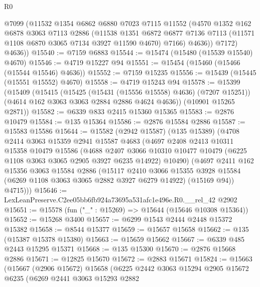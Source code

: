 \begin{lexlean}{R0}
\begin{coremodule}
          @7099
          (@11532
            @1354
            @6862
            @6880
            @7023
            @7115
            @11552
            (@4570
              @1352
              @162
              @6878
              @3063
              @7113
              @2886
              (@11538
                @1351
                @6872
                @6877
                @7136
                @7113
                (@11571 @1108 @6870 @3065 @7134 @3927 @11590 @4670)
                @7166)
              @4636))
          @7172)
        @4636))
@15540 := @7159 @6883
@15544 := @15474 (@15480 (@15539 @15540) @4670)
@15546 := @4719 @15227 @94
@15551 := @15454 (@15460 (@15466 (@15544 @15546) @4636))
@15552 := @7159 @15235
@15556 := @15439 (@15445 (@15551 @15552) @4670)
@15558 := @4719 @15243 @94
@15578 := @15399
    (@15409
      (@15415
        (@15425 (@15431 (@15556 @15558) @4636) (@7207 @15251))
        (@4614 @162 @3063 @3063 @2884 @2886 @4624 @4636))
      (@10901 @15265 @2871))
@15582 := @6339 @833 @2415 @15360 @15365
@15583 := @2876 @10479
@15584 := @135 @15364
@15586 := @2876 @15584 @2886
@15587 := @15583 @15586
@15644 := @15582
    (@2942 @15587)
    (@135 @15389)
    (@4708
      @2414
      @3063
      @15359
      @2941
      @15587
      @4683
      (@4697
        @2408
        @2413
        @10311
        @15358
        @10479
        @15586
        (@4688
          @2407
          @3066
          @10310
          @10477
          @10479
          (@6225 @1108 @3063 @3065 @2905 @3927 @6235 @14922)
          @10490)
        (@4697
          @2411
          @162
          @15356
          @3063
          @15584
          @2886
          (@15117
            @2410
            @3066
            @15355
            @3928
            @15584
            (@6269 @1108 @3063 @3065 @2882 @3927 @6279 @14922)
            (@15169 @94))
          @4715)))
@15646 := LexLeanPreserve.C2ee05bb6fb924a73695a531afc1e496e.R0.__rel_42 @2902
@15651 := @15578 (fun ("_" : @15269) => @15644 (@15646 @10308 @15364))
@15652 := @15268 @3400
@15657 := @6299 @1543 @2444 @2448 @15372 @15382
@15658 := @8544 @15377
@15659 := @15657 @15658
@15662 := @135 (@15387 @15378 @15380)
@15663 := @15659 @15662
@15667 := @6339 @485 @2443 @15295 @15371
@15668 := @135 @15300
@15670 := @2876 @15668 @2886
@15671 := @12825 @15670
@15672 := @2883 @15671
@15824 := @15663
    (@15667
      (@2906 @15672)
      @15658
      (@6225
        @2442
        @3063
        @15294
        @2905
        @15672
        @6235
        (@6269
          @2441
          @3063
          @15293
          @2882

\end{coremodule}
\end{lexlean}
